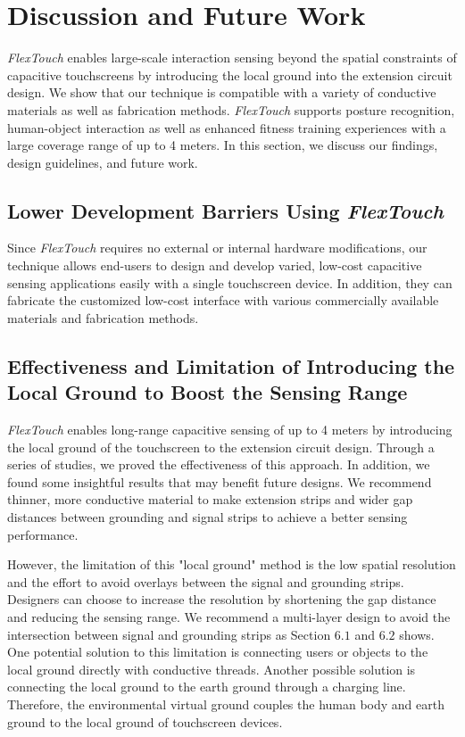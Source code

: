 \chapter{Discussion and Future Work}
\textit{FlexTouch} enables large-scale interaction sensing beyond the spatial constraints of capacitive touchscreens by introducing the local ground into the extension circuit design. We show that our technique is compatible with a variety of conductive materials as well as fabrication methods. \textit{FlexTouch} supports posture recognition, human-object interaction as well as enhanced fitness training experiences with a large coverage range of up to 4 meters. In this section, we discuss our findings, design guidelines, and future work. 
\section{Lower Development Barriers Using \textit{FlexTouch}}
Since \textit{FlexTouch} requires no external or internal hardware modifications, our technique allows end-users to design and develop varied, low-cost capacitive sensing applications easily with a single touchscreen device. In addition, they can fabricate the customized low-cost interface with various commercially available materials and fabrication methods. 

\section{Effectiveness and Limitation of Introducing the Local Ground to Boost the Sensing Range}
\textit{FlexTouch} enables long-range capacitive sensing of up to 4 meters by introducing the local ground of the touchscreen to the extension circuit design. Through a series of studies, we proved the effectiveness of this approach. In addition, we found some insightful results that may benefit future designs. We recommend thinner, more conductive material to make extension strips and wider gap distances between grounding and signal strips to achieve a better sensing performance.

However, the limitation of this "local ground" method is the low spatial resolution and the effort to avoid overlays between the signal and grounding strips. Designers can choose to increase the resolution by shortening the gap distance and reducing the sensing range. We recommend a multi-layer design to avoid the intersection between signal and grounding strips as Section $6.1$ and $6.2$ shows. One potential solution to this limitation is connecting users or objects to the local ground directly with conductive threads. Another possible solution is connecting the local ground to the earth ground through a charging line. Therefore, the environmental virtual ground couples the human body and earth ground to the local ground of touchscreen devices. 

